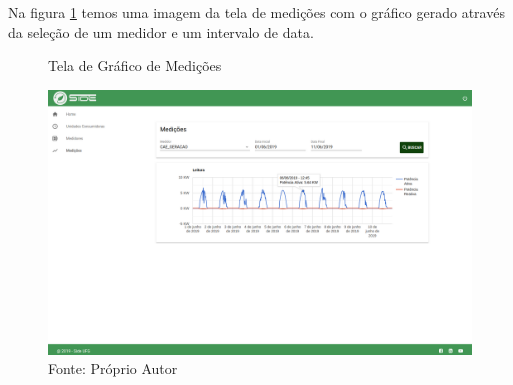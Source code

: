 Na figura \ref{fig:side-medicoes} temos uma imagem da tela de medições com o gráfico gerado através da seleção de um medidor e um intervalo de data.

\begin{figure}[H]
    \centering
    \caption{Tela de Gráfico de Medições}
\includegraphics[width=\linewidth]{imagens/side/side-medicoes.png}
    \caption*{Fonte: Próprio Autor}
    \label{fig:side-medicoes}
\end{figure}